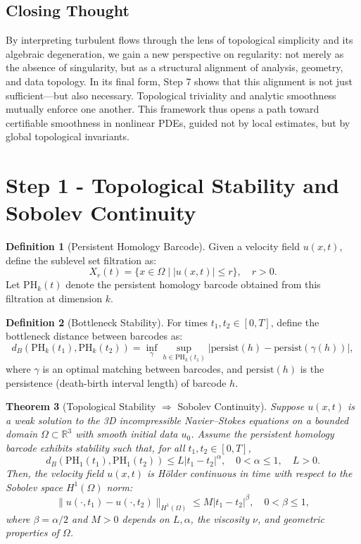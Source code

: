 \documentclass[11pt]{article}
\newtheorem{theorem}{Theorem}[section]
\theoremstyle{definition}
\newtheorem{definition}[theorem]{Definition}
\begin{document}
\subsection*{Closing Thought}

By interpreting turbulent flows through the lens of topological simplicity and its algebraic degeneration, we gain a new perspective on regularity: not merely as the absence of singularity, but as a structural alignment of analysis, geometry, and data topology. In its final form, Step 7 shows that this alignment is not just sufficient—but also necessary. Topological triviality and analytic smoothness mutually enforce one another. This framework thus opens a path toward certifiable smoothness in nonlinear PDEs, guided not by local estimates, but by global topological invariants.



\section{Step 1 - Topological Stability and Sobolev Continuity}

\begin{definition}[Persistent Homology Barcode]
Given a velocity field $u(x,t)$, define the sublevel set filtration as:
\[
X_r(t) = \{x \in \Omega \mid |u(x,t)| \leq r \}, \quad r > 0.
\]
Let $\mathrm{PH}_k(t)$ denote the persistent homology barcode obtained from this filtration at dimension $k$.
\end{definition}

\begin{definition}[Bottleneck Stability]
For times $t_1, t_2 \in [0,T]$, define the bottleneck distance between barcodes as:
\[
d_B(\mathrm{PH}_k(t_1), \mathrm{PH}_k(t_2)) = \inf_{\gamma} \sup_{h \in \mathrm{PH}_k(t_1)}|\mathrm{persist}(h)-\mathrm{persist}(\gamma(h))|,
\]
where $\gamma$ is an optimal matching between barcodes, and $\mathrm{persist}(h)$ is the persistence (death-birth interval length) of barcode $h$.
\end{definition}

\begin{theorem}[Topological Stability $\Rightarrow$ Sobolev Continuity]
\label{thm:topological_sobolev_continuity}
Suppose $u(x,t)$ is a weak solution to the 3D incompressible Navier--Stokes equations on a bounded domain $\Omega \subset \mathbb{R}^3$ with smooth initial data $u_0$. Assume the persistent homology barcode exhibits stability such that, for all $t_1,t_2\in[0,T]$,
\[
d_B(\mathrm{PH}_1(t_1), \mathrm{PH}_1(t_2)) \leq L|t_1-t_2|^{\alpha}, \quad 0 < \alpha \leq 1, \quad L > 0.
\]
Then, the velocity field $u(x,t)$ is Hölder continuous in time with respect to the Sobolev space $H^1(\Omega)$ norm:
\[
\|u(\cdot,t_1)-u(\cdot,t_2)\|_{H^1(\Omega)} \leq M|t_1-t_2|^{\beta}, \quad 0<\beta\leq 1,
\]
where $\beta = \alpha/2$ and $M > 0$ depends on $L, \alpha$, the viscosity $\nu$, and geometric properties of $\Omega$.
\end{theorem}
\end{document}
